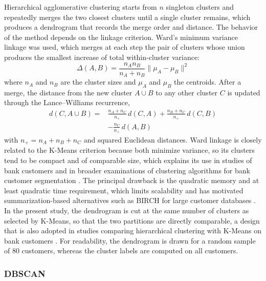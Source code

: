 \documentclass[conference]{IEEEtran}
\begin{document}
Hierarchical agglomerative clustering \cite{murtagh2012algorithms} starts from $n$ singleton clusters and repeatedly merges the two closest clusters until a single cluster remains, which produces a dendrogram that records the merge order and distance. The behavior of the method depends on the linkage criterion. Ward's minimum variance linkage was used, which merges at each step the pair of clusters whose union produces the smallest increase of total within-cluster variance:
\begin{equation}
    \Delta(A,B) = \frac{n_A n_B}{n_A + n_B} \|\mu_A - \mu_B\|^2
\end{equation}
where $n_A$ and $n_B$ are the cluster sizes and $\mu_A$ and $\mu_B$ the centroids. After a merge, the distance from the new cluster $A\cup B$ to any other cluster $C$ is updated through the Lance--Williams recurrence,
\begin{equation}
\begin{split}
    d(C, A\cup B) ={}& \frac{n_A + n_C}{n_{+}}\, d(C,A) + \frac{n_B + n_C}{n_{+}}\, d(C,B) \\
    & - \frac{n_C}{n_{+}}\, d(A,B)
\end{split}
\end{equation}
with $n_{+}=n_A+n_B+n_C$ and squared Euclidean distances. Ward linkage is closely related to the K-Means criterion because both minimize variance, so its clusters tend to be compact and of comparable size, which explains its use in studies of bank customers \cite{kikoria2020} and in broader examinations of clustering algorithms for bank customer segmentation \cite{zakrzewska2005clustering}. The principal drawback is the quadratic memory and at least quadratic time requirement, which limits scalability and has motivated summarization-based alternatives such as BIRCH for large customer databases \cite{hassan2018}. In the present study, the dendrogram is cut at the same number of clusters as selected by K-Means, so that the two partitions are directly comparable, a design that is also adopted in studies comparing hierarchical clustering with K-Means on bank customers \cite{aliyev2020}. For readability, the dendrogram is drawn for a random sample of 80 customers, whereas the cluster labels are computed on all customers.

\subsubsection{DBSCAN}
\end{document}
